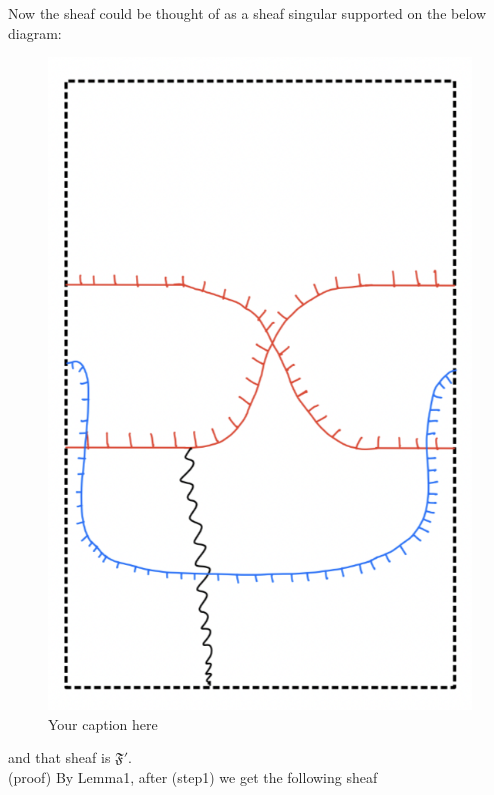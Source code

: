 Now the sheaf could be thought of as a sheaf singular supported on the below diagram:
\begin{figure}[H] %
    \centering
    \includegraphics[scale=0.95]{diagrams/lemma9/10.png} %
    \caption{Your caption here}
    \label{fig:your-label}
\end{figure}

and that sheaf is $\mathfrak{F}'$.\\
(proof) By Lemma1, after (step1) we get the following sheaf